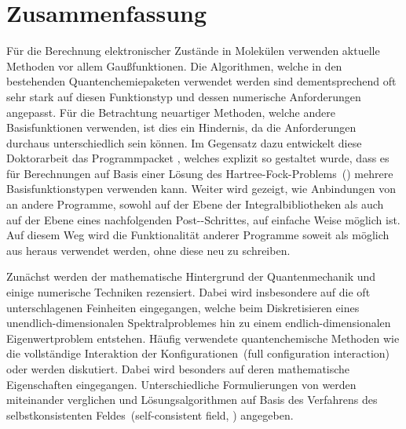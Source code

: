 %
%
\chapter*{Zusammenfassung}
{}

Für die Berechnung elektronischer Zustände in Molekülen
verwenden aktuelle Methoden vor allem Gaußfunktionen.
Die Algorithmen, welche in den bestehenden Quantenchemiepaketen
verwendet werden sind dementsprechend oft sehr stark
auf diesen Funktionstyp und dessen numerische Anforderungen angepasst.
Für die Betrachtung neuartiger Methoden,
welche andere Basisfunktionen verwenden,
ist dies ein Hindernis,
da die Anforderungen durchaus unterschiedlich sein können.
Im Gegensatz dazu entwickelt diese Doktorarbeit
das Programmpacket \molsturm,
welches explizit so gestaltet wurde,
dass es für Berechnungen auf Basis einer Lösung des Hartree-Fock-Problems~(\HF)
mehrere Basisfunktionstypen verwenden kann.
Weiter wird gezeigt, wie Anbindungen von \molsturm
an andere Programme,
sowohl auf der Ebene der Integralbibliotheken
als auch auf der Ebene eines nachfolgenden Post-\HF-Schrittes,
auf einfache Weise möglich ist.
Auf diesem Weg wird die Funktionalität anderer Programme
soweit als möglich aus \molsturm heraus verwendet werden,
ohne diese neu zu schreiben.

Zunächst werden der mathematische Hintergrund der Quantenmechanik
und einige numerische Techniken rezensiert.
Dabei wird insbesondere auf die oft unterschlagenen Feinheiten eingegangen,
welche beim Diskretisieren eines unendlich-dimensionalen Spektralproblemes
hin zu einem endlich-dimensionalen Eigenwertproblem entstehen.
Häufig verwendete quantenchemische Methoden
wie die vollständige Interaktion der Konfigurationen~(full configuration interaction)
oder \HF werden diskutiert.
Dabei wird besonders auf deren mathematische Eigenschaften eingegangen.
Unterschiedliche Formulierungen von \HF werden miteinander verglichen
und
Lösungsalgorithmen auf Basis des Verfahrens des
selbstkonsistenten Feldes~(self-consistent field, \SCF) angegeben.

